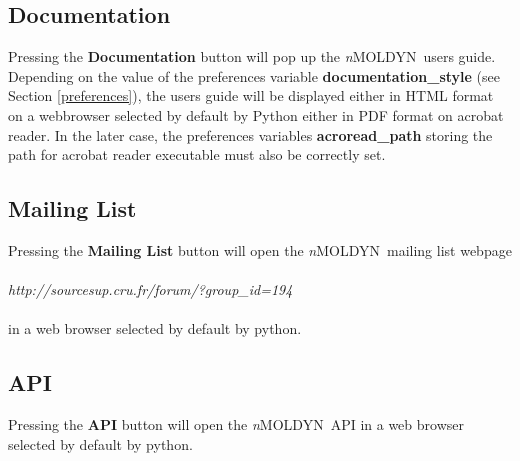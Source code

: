 \documentclass[a4paper,11pt]{report}
\newcommand{\NMOLDYN}{\textit{n}MOLDYN}
\begin{document}
\subsection{Documentation}
\label{documentation}
Pressing the \textbf{Documentation} button will pop up the \NMOLDYN\ users guide. Depending on the value of the 
preferences variable \textbf{documentation\_style} (see Section \ref{preferences}), the users guide will be displayed 
either in HTML format on a webbrowser selected by default by Python either in PDF format on acrobat reader. 
In the later case, the preferences variables \textbf{acroread\_path} storing the path for acrobat reader executable 
must also be correctly set.

\subsection{Mailing List}
\label{mailing_list}
Pressing the \textbf{Mailing List} button will open the \NMOLDYN\ mailing list webpage
\\\\
\textit{http://sourcesup.cru.fr/forum/?group\_id=194}
\\\\
in a web browser selected by default by python.

\subsection{API}
\label{api}
Pressing the \textbf{API} button will open the \NMOLDYN\ API in a web browser selected by default by python.
\end{document}
